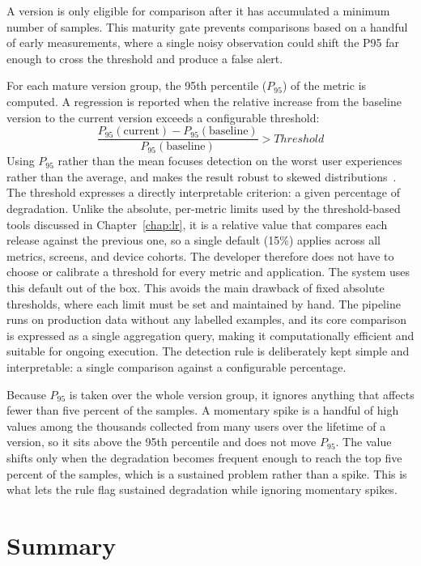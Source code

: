 A version is only eligible for comparison after it has accumulated a minimum number of samples. This maturity gate prevents comparisons based on a handful of early measurements, where a single noisy observation could shift the P95 far enough to cross the threshold and produce a false alert.

For each mature version group, the 95th percentile ($P_{95}$) of the metric is computed. A regression is reported when the relative increase from the baseline version to the current version exceeds a configurable threshold:
\begin{equation}
    \frac{P_{95}(\text{current}) - P_{95}(\text{baseline})}{P_{95}(\text{baseline})} > Threshold
\end{equation}
Using $P_{95}$ rather than the mean focuses detection on the worst user experiences rather than the average, and makes the result robust to skewed distributions~\cite{Nguyen2012, DeanTailAtScale}. The threshold expresses a directly interpretable criterion: a given percentage of degradation. Unlike the absolute, per-metric limits used by the threshold-based tools discussed in Chapter~\ref{chap:lr}, it is a relative value that compares each release against the previous one, so a single default (15\%) applies across all metrics, screens, and device cohorts. The developer therefore does not have to choose or calibrate a threshold for every metric and application. The system uses this default out of the box. This avoids the main drawback of fixed absolute thresholds, where each limit must be set and maintained by hand. The pipeline runs on production data without any labelled examples, and its core comparison is expressed as a single aggregation query, making it computationally efficient and suitable for ongoing execution. The detection rule is deliberately kept simple and interpretable: a single comparison against a configurable percentage.

Because $P_{95}$ is taken over the whole version group, it ignores anything that affects fewer than five percent of the samples. A momentary spike is a handful of high values among the thousands collected from many users over the lifetime of a version, so it sits above the 95th percentile and does not move $P_{95}$. The value shifts only when the degradation becomes frequent enough to reach the top five percent of the samples, which is a sustained problem rather than a spike. This is what lets the rule flag sustained degradation while ignoring momentary spikes.

\section{Summary}

